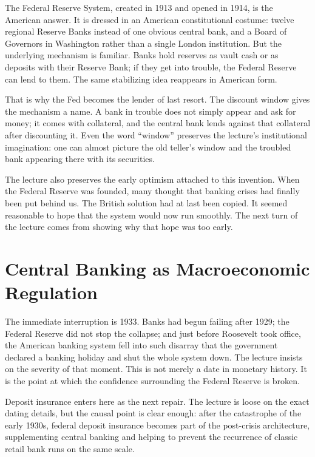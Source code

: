 The Federal Reserve System, created in 1913 and opened in 1914, is the American answer. It is dressed in an American constitutional costume: twelve regional Reserve Banks instead of one obvious central bank, and a Board of Governors in Washington rather than a single London institution. But the underlying mechanism is familiar. Banks hold reserves as vault cash or as deposits with their Reserve Bank; if they get into trouble, the Federal Reserve can lend to them. The same stabilizing idea reappears in American form.

That is why the Fed becomes the lender of last resort. The discount window gives the mechanism a name. A bank in trouble does not simply appear and ask for money; it comes with collateral, and the central bank lends against that collateral after discounting it. Even the word ``window'' preserves the lecture's institutional imagination: one can almost picture the old teller's window and the troubled bank appearing there with its securities.

The lecture also preserves the early optimism attached to this invention. When the Federal Reserve was founded, many thought that banking crises had finally been put behind us. The British solution had at last been copied. It seemed reasonable to hope that the system would now run smoothly. The next turn of the lecture comes from showing why that hope was too early.

\section{Central Banking as Macroeconomic Regulation}

The immediate interruption is 1933. Banks had begun failing after 1929; the Federal Reserve did not stop the collapse; and just before Roosevelt took office, the American banking system fell into such disarray that the government declared a banking holiday and shut the whole system down. The lecture insists on the severity of that moment. This is not merely a date in monetary history. It is the point at which the confidence surrounding the Federal Reserve is broken.

Deposit insurance enters here as the next repair. The lecture is loose on the exact dating details, but the causal point is clear enough: after the catastrophe of the early 1930s, federal deposit insurance becomes part of the post-crisis architecture, supplementing central banking and helping to prevent the recurrence of classic retail bank runs on the same scale.

